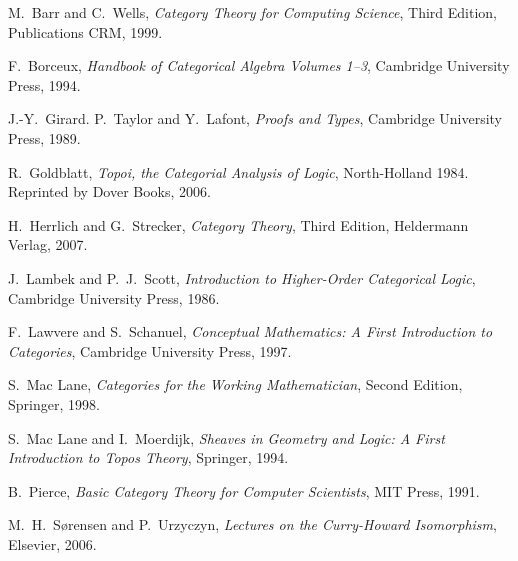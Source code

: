 \documentclass{svmult}
\begin{document}

\begin{thebibliography}{99}


M.~Barr and C.~Wells, \textsl{Category Theory for Computing Science}, Third Edition, Publications CRM, 1999.

F.~Borceux, \textsl{Handbook of Categorical Algebra Volumes 1--3}, Cambridge University Press, 1994.

J.-Y.~Girard. P.~Taylor and Y.~Lafont, \textsl{Proofs and Types}, Cambridge University Press, 1989.

R.~Goldblatt, \textsl{Topoi, the Categorial Analysis of Logic}, North-Holland 1984. Reprinted by Dover Books, 2006.

H.~Herrlich and G.~Strecker, \textsl{Category Theory}, Third Edition, Heldermann Verlag, 2007.

J.~Lambek and P.~J.~Scott, \textsl{Introduction to Higher-Order Categorical Logic}, Cambridge University Press, 1986.

F.~Lawvere and S.~Schanuel, \textsl{Conceptual Mathematics: A First Introduction to Categories}, Cambridge University Press, 1997.

S.~Mac Lane, \textsl{Categories for the Working Mathematician}, Second Edition, Springer, 1998.

S.~Mac Lane and I.~Moerdijk, \textsl{Sheaves in Geometry and Logic: A First Introduction to Topos Theory}, Springer, 1994.

B.~Pierce, \textsl{Basic Category Theory for Computer Scientists}, MIT Press, 1991.

M.~H.~S{\o}rensen and P.~Urzyczyn, \textsl{Lectures on the Curry-Howard Isomorphism}, Elsevier, 2006.

\end{thebibliography}
\end{document}
